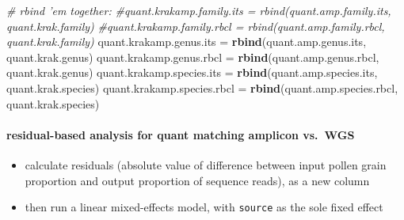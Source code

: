 \documentclass[
]{article}
\newenvironment{Shaded}{\begin{snugshade}}{\end{snugshade}}
\newcommand{\CommentTok}[1]{\textcolor[rgb]{0.56,0.35,0.01}{\textit{#1}}}
\newcommand{\KeywordTok}[1]{\textcolor[rgb]{0.13,0.29,0.53}{\textbf{#1}}}
\newcommand{\NormalTok}[1]{#1}
\newcommand{\StringTok}[1]{\textcolor[rgb]{0.31,0.60,0.02}{#1}}
\providecommand{\tightlist}{%
  \setlength{\itemsep}{0pt}\setlength{\parskip}{0pt}}
\begin{document}
\begin{Shaded}
\begin{Highlighting}[]
\CommentTok{# rbind 'em together: }
\CommentTok{#quant.krakamp.family.its = rbind(quant.amp.family.its, quant.krak.family)}
\CommentTok{#quant.krakamp.family.rbcl = rbind(quant.amp.family.rbcl, quant.krak.family)}
\NormalTok{quant.krakamp.genus.its =}\StringTok{ }\KeywordTok{rbind}\NormalTok{(quant.amp.genus.its, quant.krak.genus)}
\NormalTok{quant.krakamp.genus.rbcl =}\StringTok{ }\KeywordTok{rbind}\NormalTok{(quant.amp.genus.rbcl, quant.krak.genus)}
\NormalTok{quant.krakamp.species.its =}\StringTok{ }\KeywordTok{rbind}\NormalTok{(quant.amp.species.its, quant.krak.species)}
\NormalTok{quant.krakamp.species.rbcl =}\StringTok{ }\KeywordTok{rbind}\NormalTok{(quant.amp.species.rbcl, quant.krak.species)}
\end{Highlighting}
\end{Shaded}

\hypertarget{residual-based-analysis-for-quant-matching-amplicon-vs.-wgs}{%
\paragraph{residual-based analysis for quant matching amplicon
vs.~WGS}\label{residual-based-analysis-for-quant-matching-amplicon-vs.-wgs}}

\begin{itemize}
\tightlist
\item
  calculate residuals (absolute value of difference between input pollen
  grain proportion and output proportion of sequence reads), as a new
  column
\item
  then run a linear mixed-effects model, with \texttt{source} as the
  sole fixed effect
\end{itemize}
\end{document}
